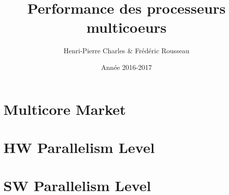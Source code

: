 \documentclass{beamer}
\title{Performance des processeurs multicoeurs}
\subtitle{}
\author{Henri-Pierre Charles \& Frédéric Rousseau}
\date{Année 2016-2017}
\newcommand{\Slide}[1]{}
\begin{document}
\begin{frame}
\titlepage
\end{frame}
\section{Multicore Market}
\Slide{Market/MotivatingExample1}
\Slide{Market/MotivatingExample2}
\Slide{Market/MotivatingExample3}
\Slide{Market/MotivatingCode1}
\Slide{Market/MotivatingCode2}
\begin{frame}
  \begin{multicols}{2}
{\small    \tableofcontents[
]}
  \end{multicols}
\end{frame}
\section{HW Parallelism Level}
\Slide{HWParallelismLevel/MultipleLevel}
\Slide{HWParallelismLevel/ILP}
\Slide{HWParallelismLevel/VLIW}
\Slide{HWParallelismLevel/uArch}
\Slide{HWParallelismLevel/MultiCore}
\Slide{HWParallelismLevel/MultiCPU}
\Slide{HWParallelismLevel/Cluster}
\Slide{HWParallelismLevel/MPSoC}
\Slide{HWParallelismLevel/GPU}

\section{SW Parallelism Level}
\Slide{SWParallelismLevel/Thread}
\Slide{SWParallelismLevel/MPI}
\Slide{SWParallelismLevel/OpenMP}
\Slide{SWParallelismLevel/OpenCL}
\Slide{SWParallelismLevel/CUDA}
\end{document}
